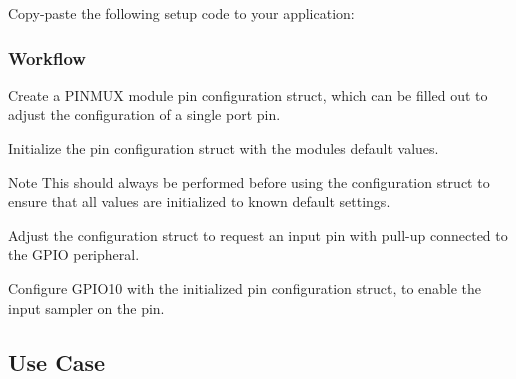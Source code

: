 Copy-\/paste the following setup code to your application\+: 
\begin{DoxyCodeInclude}{0}
\end{DoxyCodeInclude}
 \hypertarget{asfdoc_sam0_system_pinmux_basic_use_case_asfdoc_sam0_system_pinmux_basic_use_case_setup_flow}{}\subsubsection{Workflow}\label{asfdoc_sam0_system_pinmux_basic_use_case_asfdoc_sam0_system_pinmux_basic_use_case_setup_flow}

\begin{DoxyEnumerate}
\item Create a P\+I\+N\+M\+UX module pin configuration struct, which can be filled out to adjust the configuration of a single port pin. 
\begin{DoxyCodeInclude}{0}
\end{DoxyCodeInclude}

\item Initialize the pin configuration struct with the module\textquotesingle{}s default values. 
\begin{DoxyCodeInclude}{0}
\end{DoxyCodeInclude}
 \begin{DoxyNote}{Note}
This should always be performed before using the configuration struct to ensure that all values are initialized to known default settings.
\end{DoxyNote}

\item Adjust the configuration struct to request an input pin with pull-\/up connected to the G\+P\+IO peripheral. 
\begin{DoxyCodeInclude}{0}
\end{DoxyCodeInclude}

\item Configure G\+P\+I\+O10 with the initialized pin configuration struct, to enable the input sampler on the pin. 
\begin{DoxyCodeInclude}{0}
\end{DoxyCodeInclude}
 
\end{DoxyEnumerate}\hypertarget{asfdoc_sam0_system_pinmux_basic_use_case_asfdoc_sam0_system_pinmux_basic_use_case_use_main}{}\subsection{Use Case}\label{asfdoc_sam0_system_pinmux_basic_use_case_asfdoc_sam0_system_pinmux_basic_use_case_use_main}
